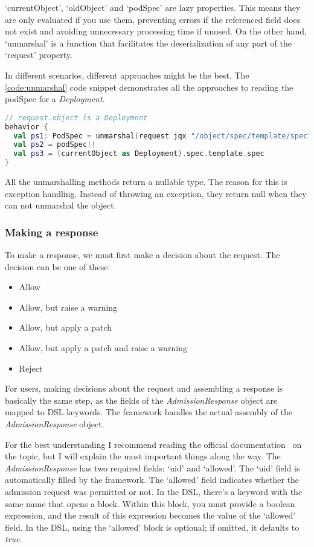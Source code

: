 `currentObject', `oldObject' and `podSpec' are lazy properties. This means they are only evaluated if you use them, preventing errors if the referenced field does not exist and avoiding unnecessary processing time if unused. On the other hand, `unmarshal' is a function that facilitates the deserialization of any part of the `request' property.

In different scenarios, different approaches might be the best. The \ref{code:unmarshal} code snippet demonstrates all the approaches to reading the podSpec for a \emph{Deployment}.

\begin{lstlisting}[caption={Unmarshalling},language=Kotlin,label=code:unmarshal]
// request.object is a Deployment
behavior {
  val ps1: PodSpec = unmarshal(request jqx "/object/spec/template/spec")!!
  val ps2 = podSpec!!
  val ps3 = (currentObject as Deployment).spec.template.spec
}
\end{lstlisting}

All the unmarshalling methods return a nullable type. The reason for this is exception handling. Instead of throwing an exception, they return null when they can not unmarshal the object.

\subsubsection{Making a response}

To make a response, we must first make a decision about the request. The decision can be one of these:

\begin{itemize}
    \item Allow
    \item Allow, but raise a warning
    \item Allow, but apply a patch
    \item Allow, but apply a patch and raise a warning
    \item Reject
\end{itemize}

For users, making decisions about the request and assembling a response is basically the same step, as the fields of the \emph{AdmissionResponse} object are mapped to DSL keywords. The framework handles the actual assembly of the \emph{AdmissionResponse} object. 

For the best understanding I recommend reading the official documentation~\cite{AdmissionResponseDocs} on the topic, but I will explain the most important things along the way. The \emph{AdmissionResponse} has two required fields: `uid' and `allowed'. The `uid' field is automatically filled by the framework. The `allowed' field indicates whether the admission request was permitted or not. In the DSL, there's a keyword with the same name that opens a block. Within this block, you must provide a boolean expression, and the result of this expression becomes the value of the `allowed' field. In the DSL, using the `allowed' block is optional; if omitted, it defaults to \emph{true}.

